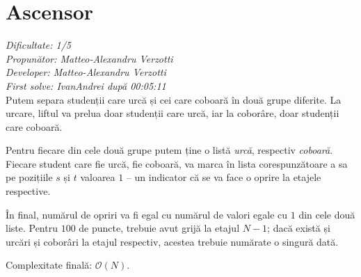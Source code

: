 \section{Ascensor}
\textit{Dificultate: 1/5} \\
\textit{Propunător: Matteo-Alexandru Verzotti} \\
\textit{Developer: Matteo-Alexandru Verzotti} \\
\textit{First solve: IvanAndrei după 00:05:11}  \\

Putem separa studenții care urcă și cei care coboară în două grupe diferite. La urcare, liftul va prelua doar studenții care urcă, iar la coborâre, doar studenții care coboară.

Pentru fiecare din cele două grupe putem ține o listă \textit{urcă}, respectiv \textit{coboară}.
Fiecare student care fie urcă, fie coboară, va marca în lista corespunzătoare a sa pe pozițiile $s$ și $t$ valoarea $1$ -- un indicator că se va face o oprire la etajele respective.

În final, numărul de opriri va fi egal cu numărul de valori egale cu $1$ din cele două liste. Pentru $100$ de puncte, trebuie avut grijă la etajul $N - 1$; dacă există și urcări și coborâri la etajul respectiv, acestea trebuie numărate o singură dată.

\medskip

Complexitate finală: $\mathcal{O}(N)$.

